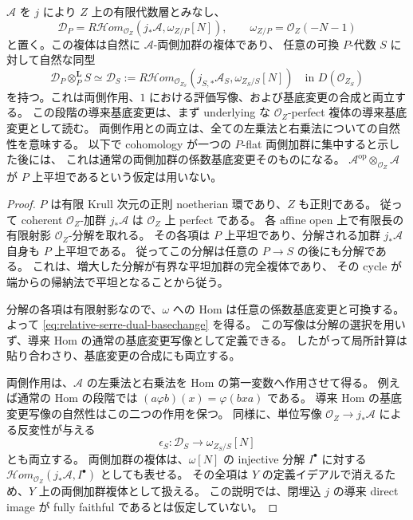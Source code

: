 \begin{lemma}\label{lem:relative-serre-ambient-dual}
$\mathscr A$ を $j$ により $Z$ 上の有限代数層とみなし、
\[
 \mathscr D_P=
 R\mathcal Hom_{\mathcal O_Z}
 (j_*\mathscr A,\omega_{Z/P}[N]),
 \qquad \omega_{Z/P}=\mathcal O_Z(-N-1)
\]
と置く。この複体は自然に $\mathscr A$-両側加群の複体であり、
任意の可換 $P$-代数 $S$ に対して自然な同型
\begin{equation}\label{eq:relative-serre-dual-basechange}
 \mathscr D_P\otimes_P^{\mathbf L}S\simeq
 \mathscr D_S:={}
 R\mathcal Hom_{\mathcal O_{Z_S}}
 (j_{S,*}\mathscr A_S,\omega_{Z_S/S}[N])
 \quad\text{in }D(\mathcal O_{Z_S})
\end{equation}
を持つ。これは両側作用、$1$ における評価写像、および基底変更の合成と両立する。
この段階の導来基底変更は、まず underlying な
$\mathcal O_Z$-perfect 複体の導来基底変更として読む。
両側作用との両立は、全ての左乗法と右乗法についての自然性を意味する。
以下で cohomology が一つの $P$-flat 両側加群に集中すると示した後には、
これは通常の両側加群の係数基底変更そのものになる。
$\mathscr A^{\mathrm{op}}\otimes_{\mathcal O_Z}\mathscr A$ が
$P$ 上平坦であるという仮定は用いない。
\end{lemma}

\begin{proof}
$P$ は有限 Krull 次元の正則 noetherian 環であり、$Z$ も正則である。
従って coherent $\mathcal O_Z$-加群 $j_*\mathscr A$ は
$\mathcal O_Z$ 上 perfect である。
各 affine open 上で有限長の有限射影 $\mathcal O_Z$-分解を取れる。
その各項は $P$ 上平坦であり、分解される加群 $j_*\mathscr A$ 自身も $P$ 上平坦である。
従ってこの分解は任意の $P\to S$ の後にも分解である。
これは、増大した分解が有界な平坦加群の完全複体であり、
その cycle が端からの帰納法で平坦となることから従う。

分解の各項は有限射影なので、$\omega$ への Hom は任意の係数基底変更と可換する。
よって \eqref{eq:relative-serre-dual-basechange} を得る。
この写像は分解の選択を用いず、導来 Hom の通常の基底変更写像として定義できる。
したがって局所計算は貼り合わさり、基底変更の合成にも両立する。

両側作用は、$\mathscr A$ の左乗法と右乗法を Hom の第一変数へ作用させて得る。
例えば通常の Hom の段階では
$(a\varphi b)(x)=\varphi(bxa)$ である。
導来 Hom の基底変更写像の自然性はこの二つの作用を保つ。
同様に、単位写像 $\mathcal O_Z\to j_*\mathscr A$ による反変性が与える
\begin{equation}\label{eq:relative-serre-evaluation-one}
 \epsilon_S:\mathscr D_S\longrightarrow\omega_{Z_S/S}[N]
\end{equation}
とも両立する。
両側加群の複体は、$\omega[N]$ の injective 分解 $I^\bullet$ に対する
$\mathcal Hom_{\mathcal O_Z}(j_*\mathscr A,I^\bullet)$ としても表せる。
その全項は $Y$ の定義イデアルで消えるため、$Y$ 上の両側加群複体として扱える。
この説明では、閉埋込 $j$ の導来 direct image が fully faithful であるとは仮定していない。
\end{proof}

